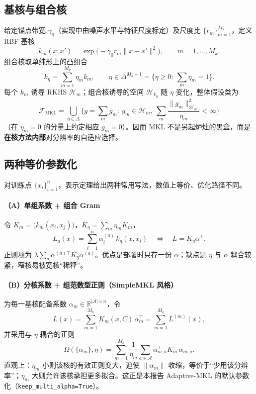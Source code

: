 \subsection{基核与组合核}
给定锚点带宽 $\gamma_0$（实现中由噪声水平与特征尺度标定）及尺度比 $\{r_m\}_{m=1}^{M_k}$，定义 RBF 基核
\begin{equation}
k_m(x,x')=\exp\big(-\gamma_0 r_m\|x-x'\|^2\big),\qquad m=1,\ldots,M_k.
\label{eq:base-km}
\end{equation}
组合核取单纯形上的凸组合
\begin{equation}
k_\eta=\sum_{m=1}^{M_k}\eta_m k_m,\qquad
\eta\in\Delta^{M_k-1}
=\Big\{\eta\ge 0:\ \sum_m\eta_m=1\Big\}.
\label{eq:k-eta}
\end{equation}
每个 $k_m$ 诱导 RKHS $\mathcal{H}_m$；组合核诱导的空间 $\mathcal{H}_{k_\eta}$ 随 $\eta$ 变化，整体假设类为
\begin{equation}
\mathcal{F}_{\mathrm{MKL}}
=\bigcup_{\eta\in\Delta}
\Big\{
g=\sum_m g_m:\ g_m\in\mathcal{H}_m,\ 
\sum_m\frac{\|g_m\|_{\mathcal{H}_m}^2}{\eta_m}<\infty
\Big\}
\end{equation}
（在 $\eta_m=0$ 的分量上约定相应 $g_m=0$）。因而 MKL 不是另起炉灶的黑盒，而是\textbf{在核方法内部}对分辨率的自适应选择。

\subsection{两种等价参数化}
对训练点 $\{x_i\}_{i=1}^n$，表示定理给出两种常用写法，数值上等价、优化路径不同。

\paragraph{（A）单组系数 + 组合 Gram}
令 $K_m=\big(k_m(x_i,x_j)\big)$，$K_\eta=\sum_m\eta_m K_m$，
\begin{equation}
L_a(x)=\sum_{i=1}^n \alpha_i^{(a)}\,k_\eta(x,x_i)
\quad\Leftrightarrow\quad
L=K_\eta\alpha^\top.
\label{eq:mkl-A}
\end{equation}
正则项为 $\lambda\sum_a\alpha^{(a)\top}K_\eta\alpha^{(a)}$。优点是部署时只存一份 $\alpha$；缺点是 $\eta$ 与 $\alpha$ 耦合较紧，窄核易被宽核“稀释”。

\paragraph{（B）分核系数 + 组范数型正则（SimpleMKL 风格）}
为每一基核配备系数 $\alpha_m\in\mathbb{R}^{|\mathcal{A}|\times n}$，令
\begin{equation}
L(x)=\sum_{m=1}^{M_k} K_m(x,C)\,\alpha_m^\top
=\sum_{m=1}^{M_k} L^{(m)}(x),
\label{eq:mkl-B}
\end{equation}
并采用与 $\eta$ 耦合的正则\cite{rakotomamonjy2008,bach2004}
\begin{equation}
\Omega(\{\alpha_m\},\eta)
=\sum_{m=1}^{M_k}\frac{1}{\eta_m}
\sum_{a\in\mathcal{A}}
\alpha_{m,a}^\top K_m\,\alpha_{m,a}.
\label{eq:mkl-reg}
\end{equation}
直观上：$\eta_m$ 小则该核的有效正则变大，迫使 $\|\alpha_m\|$ 收缩，等价于“少用该分辨率”；$\eta_m$ 大则允许该核承担更多拟合。这正是本报告 Adaptive-MKL 的默认参数化（\texttt{keep\_multi\_alpha=True}）。

